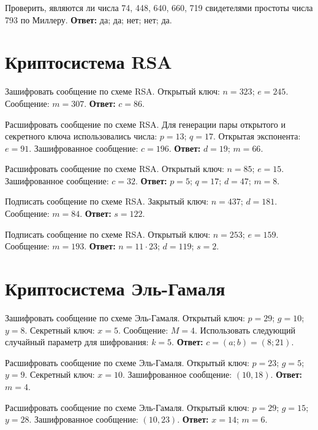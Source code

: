 \tasknumber Проверить, являются ли числа 74, 448, 640, 660, 719 свидетелями простоты числа 793 по Миллеру.
\medbreak
\textbf{Ответ:} да; да; нет; нет; да.
\bigbreak

\section{Криптосистема RSA}
\tasksection

\tasknumber Зашифровать сообщение по схеме RSA. Открытый ключ: $n = 323$; $e = 245$. Сообщение: $m = 307$.
\medbreak
\textbf{Ответ:} $c = 86$.
\bigbreak

\tasknumber Расшифровать сообщение по схеме RSA. Для генерации пары открытого и секретного ключа использовались числа: $p = 13$; $q = 17$. Открытая экспонента: $e = 91$. Зашифрованное сообщение: $c = 196$.
\medbreak
\textbf{Ответ:} $d = 19$; $m = 66$.
\bigbreak

\tasknumber Расшифровать сообщение по схеме RSA. Открытый ключ: $n = 85$; $e = 15$. Зашифрованное сообщение: $c = 32$.
\medbreak
\textbf{Ответ:} $p = 5$; $q = 17$; $d = 47$; $m = 8$.
\bigbreak

\tasknumber Подписать сообщение по схеме RSA. Закрытый ключ: $n = 437$; $d = 181$. Сообщение: $m = 84$.
\medbreak
\textbf{Ответ:} $s = 122$.
\bigbreak

\tasknumber Подписать сообщение по схеме RSA. Открытый ключ: $n = 253$; $e = 159$. Сообщение: $m = 193$.
\medbreak
\textbf{Ответ:} $n = 11 \cdot 23$; $d = 119$; $s = 2$.

\section{Криптосистема Эль-Гамаля}
\tasksection

\tasknumber Зашифровать сообщение по схеме Эль-Гамаля. Открытый ключ: $p = 29$; $g = 10$; $y = 8$. Секретный ключ: $x = 5$. Сообщение: $M = 4$. Использовать следующий случайный параметр для шифрования: $k = 5$.
\medbreak
\textbf{Ответ:} $c = (a; b) = (8; 21)$.
\bigbreak

\tasknumber Расшифровать сообщение по схеме Эль-Гамаля. Открытый ключ: $p = 23$; $g = 5$; $y = 9$. Секретный ключ: $x = 10$. Зашифрованное сообщение: $\left( 10, 18\right)$.
\medbreak
\textbf{Ответ:} $m = 4$.
\bigbreak

\tasknumber Расшифровать сообщение по схеме Эль-Гамаля. Открытый ключ: $p = 29$; $g = 15$; $y = 28$. Зашифрованное сообщение: $\left( 10, 23\right)$.
\medbreak
\textbf{Ответ:} $x = 14$; $m = 6$.
\bigbreak

